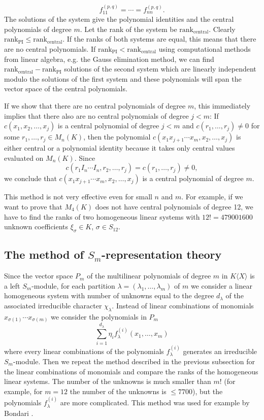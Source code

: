 \documentclass[12pt]{amsart}
\theoremstyle{definition}
\begin{document}
\[
f^{(p,q)}_{11}=\cdots=f^{(p,q)}_{nn}.
\]
The solutions of the system give the polynomial identities and the central polynomials of degree $m$. Let the rank of the system be $\text{rank}_{\text{central}}$.
Clearly $\text{rank}_{\text{PI}}\leq\text{rank}_{\text{central}}$.
If the ranks of both systems are equal, this means that there are no central polynomials. If $\text{rank}_{\text{PI}}<\text{rank}_{\text{central}}$ using computational methods from linear algebra,
e.g. the Gauss elimination method, we can find $\text{rank}_{\text{central}}-\text{rank}_{\text{PI}}$ solutions of the second system which are linearly independent modulo the solutions of the first system
and these polynomials will span the vector space of the central polynomials.

If we show that there are no central polynomials of degree $m$, this immediately implies that there also are no central polynomials of degree $j<m$:
If $c(x_1,x_2,\ldots,x_j)$ is a central polynomial of degree $j<m$ and $c(r_1,\ldots,r_j)\not=0$ for some $r_1,\ldots,r_j\in M_n(K)$,
then the polynomial $c(x_1x_{j+1}\cdots x_m,x_2,\ldots,x_j)$ is either central or a polynomial identity because it takes only central values evaluated on $M_n(K)$.
Since
\[
c(r_1I_n\cdots I_n,r_2,\ldots,r_j)=c(r_1,\ldots,r_j)\not=0,
\]
we conclude that $c(x_1x_{j+1}\cdots x_m,x_2,\ldots,x_j)$ is a central polynomial of degree $m$.

This method is not very effective even for small $n$ and $m$. For example, if we want to prove that $M_4(K)$ does not have central polynomials of degree 12,
we have to find the ranks of two homogeneous linear systems with $12!=479001600$ unknown coefficients $\xi_{\sigma}\in K$, $\sigma\in S_{12}$.

\subsection{The method of $S_m$-representation theory}
Since the vector space $P_m$ of the multilinear polynomials of degree $m$ in $K\langle X\rangle$ is a left $S_m$-module,
for each partition $\lambda=(\lambda_1,\ldots,\lambda_m)$ of $m$ we consider a linear homogeneous system with
number of unknowns equal to the degree $d_{\lambda}$ of the associated irreducible character $\chi_{\lambda}$.
Instead of linear combinations of monomials $x_{\sigma(1)}\cdots x_{\sigma(m)}$ we consider the polynomials in $P_m$
\[
\sum_{i=1}^{d_{\lambda}}\eta_if_{\lambda}^{(i)}(x_1,\ldots,x_m)
\]
where every linear combinations of the polynomials $f_{\lambda}^{(i)}$ generates an  irreducible $S_m$-module.
Then we repeat the method described in the previous subsection for the linear combinations of monomials and compare the ranks of the homogeneous linear systems.
The number of the unknowns is much smaller than $m!$ (for example, for $m=12$ the number of the unknowns is $\leq 7700$), but the polynomials $f_{\lambda}^{(i)}$ are more complicated.
This method was used for example by Bondari \cite{Bo}.
\end{document}
